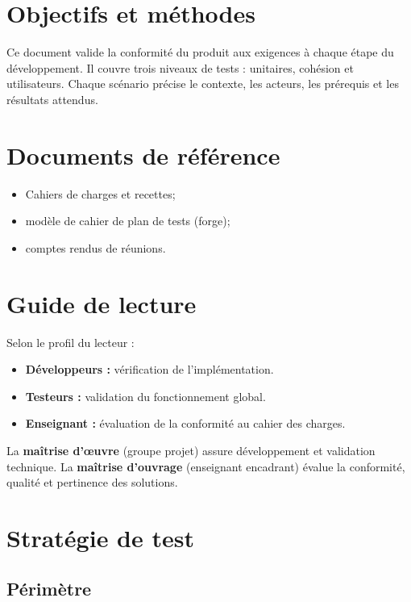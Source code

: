 \documentclass[a4paper,11pt]{report}
\begin{document}
\section{Objectifs et méthodes}
Ce document valide la conformité du produit aux exigences à chaque étape du développement.
Il couvre trois niveaux de tests : unitaires, cohésion et utilisateurs. Chaque scénario
précise le contexte, les acteurs, les prérequis et les résultats attendus.

\section{Documents de référence}
\begin{itemize}
  \item Cahiers de charges et recettes;
  \item modèle de cahier de plan de tests (forge);
  \item comptes rendus de réunions.
\end{itemize}

\section{Guide de lecture}
Selon le profil du lecteur :
\begin{itemize}
  \item \textbf{Développeurs :} vérification de l'implémentation.
  \item \textbf{Testeurs :} validation du fonctionnement global.
  \item \textbf{Enseignant :} évaluation de la conformité au cahier des charges.
\end{itemize}

La \textbf{maîtrise d'œuvre} (groupe projet) assure développement et validation technique.
La \textbf{maîtrise d'ouvrage} (enseignant encadrant) évalue la conformité, qualité et pertinence des solutions.

\section{Stratégie de test}

\subsection{Périmètre}
\end{document}
